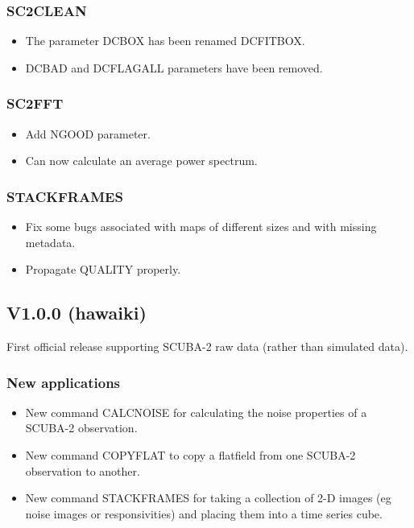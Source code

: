 \documentclass[oneside,11pt]{starlink}
\begin{document}
\subsubsection{SC2CLEAN}

\begin{itemize}
\item The parameter DCBOX has been renamed DCFITBOX.
\item DCBAD and DCFLAGALL parameters have been removed.
\end{itemize}

\subsubsection{SC2FFT}

\begin{itemize}
\item Add NGOOD parameter.
\item Can now calculate an average power spectrum.
\end{itemize}

\subsubsection{STACKFRAMES}

\begin{itemize}
\item Fix some bugs associated with maps of different sizes and with
  missing metadata.
\item Propagate QUALITY properly.
\end{itemize}

\subsection{V1.0.0 (hawaiki)}

First official release supporting SCUBA-2 raw data (rather than simulated data).

\subsubsection*{New applications}
\begin{itemize}
\item New command CALCNOISE for calculating the noise properties of a SCUBA-2 observation.
\item New command COPYFLAT to copy a flatfield from one SCUBA-2 observation to another.
\item New command STACKFRAMES for taking a collection of 2-D images
  (eg noise images or responsivities) and placing them into a time
  series cube.
\end{itemize}
\end{document}
